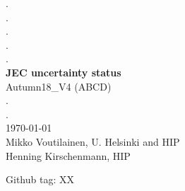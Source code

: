 \documentclass[landscape,10pt]{beamer} %
\begin{document}
\begin{centering}
{. }\\
{. }\\
{. }\\
{. }\\
{. }\\
{\bf JEC uncertainty status}\\
Autumn18\_V4 (ABCD)\\
.\\
.\\
\today\\
Mikko Voutilainen, U. Helsinki and HIP\\
Henning Kirschenmann, HIP\\
\end{centering}

\newpage

Github tag: XX
\end{document}
